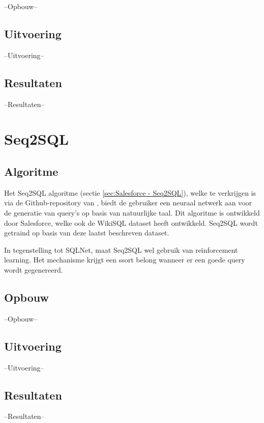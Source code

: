--Opbouw--

\subsection{Uitvoering}

--Uitvoering--

\subsection{Resultaten}

--Resultaten--

\section{Seq2SQL}

\subsection{Algoritme}

Het Seq2SQL algoritme (sectie \ref{sec:Salesforce - Seq2SQL}), welke te verkrijgen is via de Github-repository van \textcite{seq2sql}, biedt de gebruiker een neuraal netwerk aan voor de generatie van query's op basis van natuurlijke taal. Dit algoritme is ontwikkeld door Salesforce, welke ook de WikiSQL dataset heeft ontwikkeld. Seq2SQL wordt getraind op basis van deze laatst beschreven dataset.

In tegenstelling tot SQLNet, maat Seq2SQL wel gebruik van reïnforcement learning. Het mechanisme krijgt een ssort belong wanneer er een goede query wordt gegenereerd. 

\subsection{Opbouw}

--Opbouw--

\subsection{Uitvoering}

--Uitvoering--

\subsection{Resultaten}

--Resultaten--
